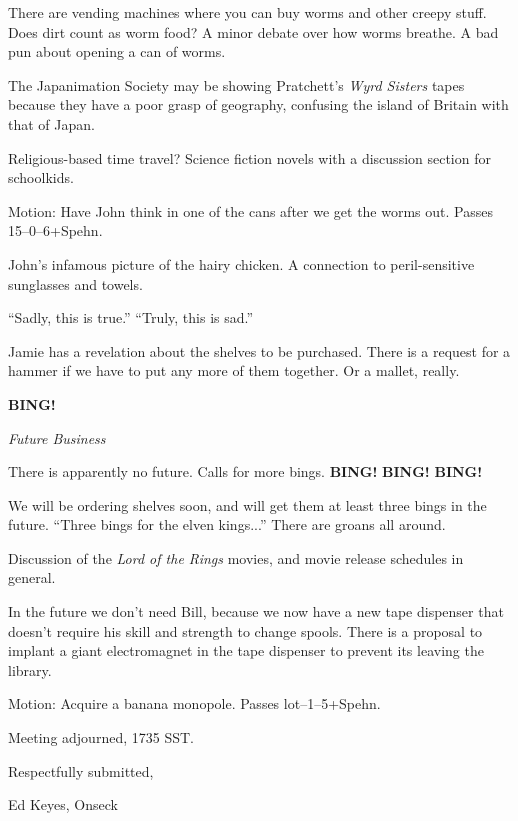 \documentclass[12pt]{article}
\newcommand{\bing}{{\bf BING!} }
\newcommand{\goto}[1]{\bing \vskip 12pt \centerline{{\em{#1}}}}
\begin{document}
There are vending machines where you can buy worms and other creepy
stuff.  Does dirt count as worm food?  A minor debate over how worms
breathe.  A bad pun about opening a can of worms.

The Japanimation Society may be showing Pratchett's {\em Wyrd Sisters}
tapes because they have a poor grasp of geography, confusing the
island of Britain with that of Japan.

Religious-based time travel?  Science fiction novels with a discussion
section for schoolkids.

Motion: Have John think in one of the cans after we get the worms out.
Passes 15--0--6+Spehn.

John's infamous picture of the hairy chicken.  A connection to
peril-sensitive sunglasses and towels.

``Sadly, this is true.''  ``Truly, this is sad.''

Jamie has a revelation about the shelves to be purchased.  There is
a request for a hammer if we have to put any more of them together.
Or a mallet, really.

\goto{Future Business}

There is apparently no future.  Calls for more bings.  \bing \bing \bing

We will be ordering shelves soon, and will get them at least three bings
in the future.  ``Three bings for the elven kings...''  There are groans
all around.

Discussion of the {\em Lord of the Rings} movies, and movie release
schedules in general.

In the future we don't need Bill, because we now have a new tape
dispenser that doesn't require his skill and strength to change spools.
There is a proposal to implant a giant electromagnet in the tape
dispenser to prevent its leaving the library.

Motion: Acquire a banana monopole.  Passes lot--1--5+Spehn.

\vspace{12pt}

\noindent
Meeting adjourned, 1735 SST.

\vspace{18pt}

\centerline{Respectfully submitted,}
\centerline{Ed Keyes, Onseck}
\end{document}
